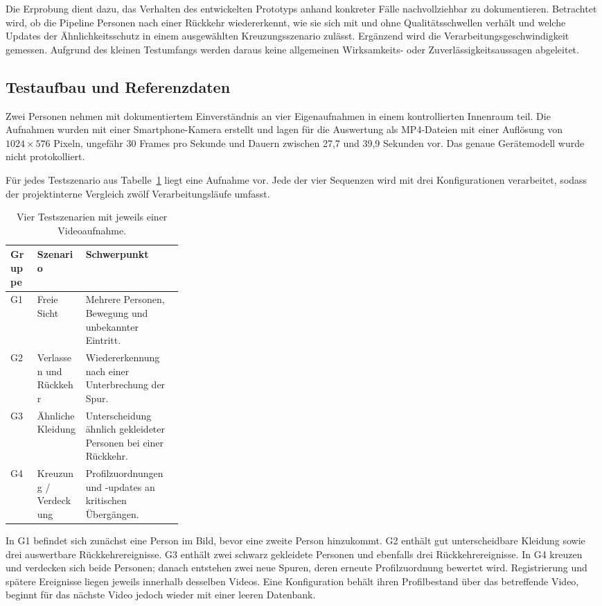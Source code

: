 \documentclass[runningheads,a4paper]{llncs}
\begin{document}
Die Erprobung dient dazu, das Verhalten des entwickelten Prototyps anhand konkreter Fälle nachvollziehbar zu dokumentieren. Betrachtet wird, ob die Pipeline Personen nach einer Rückkehr wiedererkennt, wie sie sich mit und ohne Qualitätsschwellen verhält und welche Updates der Ähnlichkeitsschutz in einem ausgewählten Kreuzungsszenario zulässt. Ergänzend wird die Verarbeitungsgeschwindigkeit gemessen. Aufgrund des kleinen Testumfangs werden daraus keine allgemeinen Wirksamkeits- oder Zuverlässigkeitsaussagen abgeleitet.

\subsection{Testaufbau und Referenzdaten}
\label{sec:reference}

Zwei Personen nehmen mit dokumentiertem Einverständnis an vier Eigenaufnahmen in einem kontrollierten Innenraum teil. Die Aufnahmen wurden mit einer Smartphone-Kamera erstellt und lagen für die Auswertung als MP4-Dateien mit einer Auflösung von $1024\times576$ Pixeln, ungefähr 30 Frames pro Sekunde und Dauern zwischen 27,7 und 39,9 Sekunden vor. Das genaue Gerätemodell wurde nicht protokolliert.

Für jedes Testszenario aus Tabelle~\ref{tab:evaluation-groups} liegt eine Aufnahme vor. Jede der vier Sequenzen wird mit drei Konfigurationen verarbeitet, sodass der projektinterne Vergleich zwölf Verarbeitungsläufe umfasst.
\begin{table}[tbp]
\caption{Vier Testszenarien mit jeweils einer Videoaufnahme.}
\label{tab:evaluation-groups}
\centering
\small
\begin{tabularx}{\linewidth}{@{}lp{0.29\linewidth}X@{}}
\toprule
Gruppe & Szenario & Schwerpunkt \\
\midrule
G1 & Freie Sicht & Mehrere Personen, Bewegung und unbekannter Eintritt. \\
G2 & Verlassen und Rückkehr & Wiedererkennung nach einer Unterbrechung der Spur. \\
G3 & Ähnliche Kleidung & Unterscheidung ähnlich gekleideter Personen bei einer Rückkehr. \\
G4 & Kreuzung / Verdeckung & Profilzuordnungen und -updates an kritischen Übergängen. \\
\bottomrule
\end{tabularx}
\end{table}
In G1 befindet sich zunächst eine Person im Bild, bevor eine zweite Person hinzukommt. G2 enthält gut unterscheidbare Kleidung sowie drei auswertbare Rückkehrereignisse. G3 enthält zwei schwarz gekleidete Personen und ebenfalls drei Rückkehrereignisse. In G4 kreuzen und verdecken sich beide Personen; danach entstehen zwei neue Spuren, deren erneute Profilzuordnung bewertet wird. Registrierung und spätere Ereignisse liegen jeweils innerhalb desselben Videos. Eine Konfiguration behält ihren Profilbestand über das betreffende Video, beginnt für das nächste Video jedoch wieder mit einer leeren Datenbank.
\end{document}
